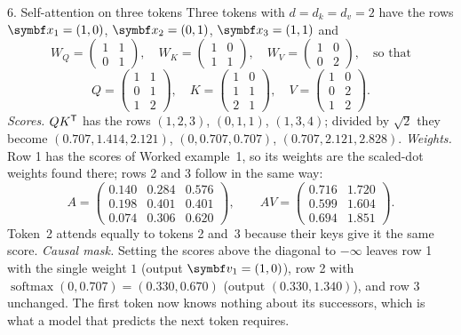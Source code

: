 \documentclass[11pt]{article}
\newcommand{\vv}{\vect{v}}
\newcommand{\softmax}{\operatorname{softmax}}
\begin{document}
\begin{worked}{6. Self-attention on three tokens}
Three tokens with $d = d_k = d_v = 2$ have the rows $\x_1 = (1, 0)$, $\x_2 = (0, 1)$, $\x_3 = (1, 1)$ and
\[
  W_Q = \begin{pmatrix} 1 & 1 \\ 0 & 1 \end{pmatrix}, \quad W_K = \begin{pmatrix} 1 & 0 \\ 1 & 1 \end{pmatrix}, \quad
  W_V = \begin{pmatrix} 1 & 0 \\ 0 & 2 \end{pmatrix}, \quad \text{so that}
\]
\[
  Q = \begin{pmatrix} 1 & 1 \\ 0 & 1 \\ 1 & 2 \end{pmatrix}, \quad
  K = \begin{pmatrix} 1 & 0 \\ 1 & 1 \\ 2 & 1 \end{pmatrix}, \quad
  V = \begin{pmatrix} 1 & 0 \\ 0 & 2 \\ 1 & 2 \end{pmatrix}.
\]
\emph{Scores.} $QK^{\mathsf{T}}$ has the rows $(1, 2, 3)$, $(0, 1, 1)$, $(1, 3, 4)$; divided by $\sqrt2$ they become $(0.707, 1.414,
2.121)$, $(0, 0.707, 0.707)$, $(0.707, 2.121, 2.828)$.
\emph{Weights.} Row 1 has the scores of Worked example~1, so its weights are the scaled-dot weights found there; rows 2
and 3 follow in the same way:
\[
  A = \begin{pmatrix} 0.140 & 0.284 & 0.576 \\ 0.198 & 0.401 & 0.401 \\ 0.074 & 0.306 & 0.620 \end{pmatrix}, \qquad
  AV = \begin{pmatrix} 0.716 & 1.720 \\ 0.599 & 1.604 \\ 0.694 & 1.851 \end{pmatrix}.
\]
Token~2 attends equally to tokens 2 and~3 because their keys give it the same score.
\emph{Causal mask.} Setting the scores above the diagonal to $-\infty$ leaves row 1 with the single weight $1$ (output
$\vv_1 = (1, 0)$), row 2 with $\softmax(0, 0.707) = (0.330, 0.670)$ (output $(0.330, 1.340)$), and row 3 unchanged. The first
token now knows nothing about its successors, which is what a model that predicts the next token requires.
\end{worked}
\end{document}

